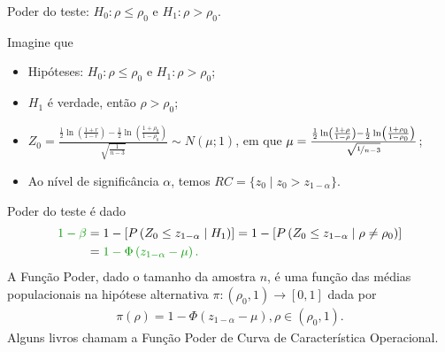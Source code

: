 \documentclass[9pt]{beamer}
\begin{document}
\begin{frame}{Poder do teste: $H_0:\rho \leq \rho_0$ e $H_1: \rho > \rho_0$.}

\normalsize

Imagine que
\begin{itemize}
	\item Hipóteses: $H_0:\rho \leq \rho_0$ e $H_1: \rho > \rho_0$;
	\item $H_1$ é verdade, então $\rho > \rho_0$;
	\item $Z_0 = \frac{\frac{1}{2} \ln\left( \frac{1 + r}{1 - r} \right) - \frac{1}{2} \ln\left( \frac{1 + \rho_0}{1 - \rho_0} \right)}{\sqrt{\frac{1}{n-3}}} \sim N\left( \mu; 1 \right)$, em que $\mu = \frac{ \frac{1}{2} \ln\left( \frac{1 + \rho}{1 - \rho} \right) -\frac{1}{2} \ln\left( \frac{1 + \rho_0}{1 - \rho_0} \right)  }{\sqrt{\nicefrac{1}{n-3}}}$;
	\item Ao nível de significância $\alpha$, temos $RC = \{ z_0 \mid z_0 > z_{1 - \alpha}   \}$.
\end{itemize}
\vfill	

Poder do teste é dado
\begin{align*}
\textcolor{important}{1-\beta} &=1 - \left[P\left( Z_0 \leq z_{1-\alpha} \mid H_1 \right)\right] = 1 - \left[P\left(  Z_0 \leq z_{1-\alpha} \mid \rho \neq \rho_0 \right)\right]\\
&=\textcolor{important}{1 - \Phi\left( z_{1-\alpha} - \mu \right).}
\end{align*}
A \textcolor{important}{Função Poder}, dado o tamanho da amostra $n$, é uma função das médias populacionais na hipótese alternativa  $\pi: (\rho_0, 1) \longrightarrow [0,1]$ dada por
\begin{align*}
\pi(\rho) = 1 - \Phi\left( z_{1-\alpha} - \mu \right), \rho \in (\rho_0, 1).
\end{align*}
Alguns livros chamam a Função Poder de \textcolor{important}{Curva de Característica Operacional.}

\normalsize

\end{frame}
\end{document}
